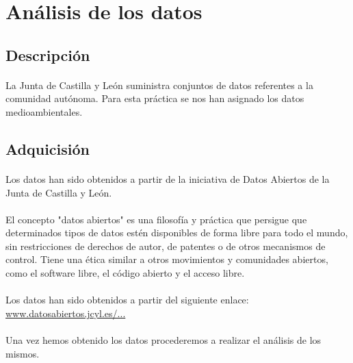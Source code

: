 \documentclass[11pt,spanish]{article}
\begin{document}
	\section{Análisis de los datos}

		\subsection{Descripción}
			\paragraph{}
			La Junta de Castilla y León suministra conjuntos de datos referentes a la comunidad autónoma. Para esta práctica se nos han asignado los datos medioambientales.

		\subsection{Adquicisión}
			\paragraph{}
			Los datos han sido obtenidos a partir de la iniciativa de Datos Abiertos de la Junta de Castilla y León.

			\paragraph{}
			El concepto "datos abiertos" es una filosofía y práctica que persigue que determinados tipos de datos estén disponibles de forma libre para todo el mundo, sin restricciones de derechos de autor, de patentes o de otros mecanismos de control. Tiene una ética similar a otros movimientos y comunidades abiertos, como el software libre, el código abierto y el acceso libre.

			\paragraph{}
			Los datos han sido obtenidos a partir del siguiente enlace: \href{http://www.datosabiertos.jcyl.es/web/jcyl/set/es/mediciones/indicadoresambientales/1284227444931}{www.datosabiertos.jcyl.es/...}

			\paragraph{}
			Una vez hemos obtenido los datos procederemos a realizar el análisis de los mismos.
\end{document}
